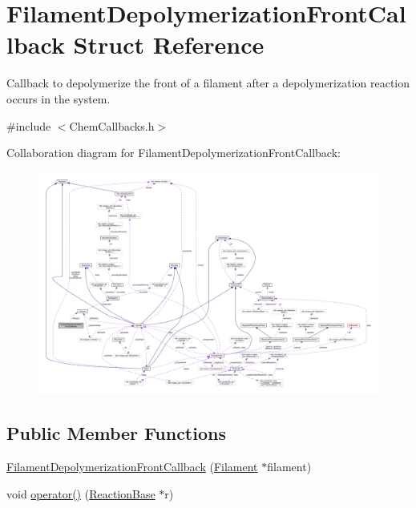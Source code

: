 \hypertarget{structFilamentDepolymerizationFrontCallback}{\section{Filament\+Depolymerization\+Front\+Callback Struct Reference}
\label{structFilamentDepolymerizationFrontCallback}
}


Callback to depolymerize the front of a filament after a depolymerization reaction occurs in the system.  




{\ttfamily \#include $<$Chem\+Callbacks.\+h$>$}



Collaboration diagram for Filament\+Depolymerization\+Front\+Callback\+:\nopagebreak
\begin{figure}[H]
\begin{center}
\leavevmode
\includegraphics[width=350pt]{structFilamentDepolymerizationFrontCallback__coll__graph}
\end{center}
\end{figure}
\subsection*{Public Member Functions}
\begin{DoxyCompactItemize}
\item 
\hyperlink{structFilamentDepolymerizationFrontCallback_ae557d44570cb2ce569ab93c97a6f860c}{Filament\+Depolymerization\+Front\+Callback} (\hyperlink{classFilament}{Filament} $\ast$filament)
\item 
void \hyperlink{structFilamentDepolymerizationFrontCallback_a741d68a920eb8dde3ebc0c94529bbd8a}{operator()} (\hyperlink{classReactionBase}{Reaction\+Base} $\ast$r)
\end{DoxyCompactItemize}
